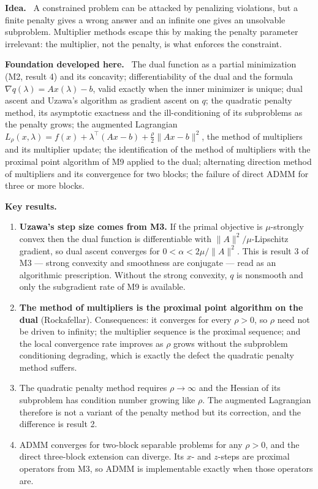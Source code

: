 \documentclass[11pt,a4paper]{article}
\newcommand{\mpart}[1]{\smallskip\noindent\textbf{#1}\ \ignorespaces}
\begin{document}
\mpart{Idea.} A constrained problem can be attacked by penalizing violations, but a finite
penalty gives a wrong answer and an infinite one gives an unsolvable subproblem. Multiplier
methods escape this by making the penalty parameter irrelevant: the multiplier, not the
penalty, is what enforces the constraint.

\mpart{Foundation developed here.} The dual function as a partial minimization (M2, result 4)
and its concavity; differentiability of the dual and the formula
$\nabla q(\lambda)=Ax(\lambda)-b$, valid exactly when the inner minimizer is unique; dual
ascent and Uzawa's algorithm as gradient ascent on $q$; the quadratic penalty method, its
asymptotic exactness and the ill-conditioning of its subproblems as the penalty grows; the
augmented Lagrangian $L_\rho(x,\lambda)=f(x)+\lambda^\top(Ax-b)+\tfrac\rho2\|Ax-b\|^2$, the
method of multipliers and its multiplier update; the identification of the method of
multipliers with the proximal point algorithm of M9 applied to the dual; alternating direction
method of multipliers and its convergence for two blocks; the failure of direct ADMM for three
or more blocks.

\mpart{Key results.}
\begin{enumerate}
\item \textbf{Uzawa's step size comes from M3.} If the primal objective is $\mu$-strongly
convex then the dual function is differentiable with $\|A\|^2/\mu$-Lipschitz gradient, so dual
ascent converges for $0<\alpha<2\mu/\|A\|^2$. This is result 3 of M3 --- strong convexity and
smoothness are conjugate --- read as an algorithmic prescription. Without the strong convexity,
$q$ is nonsmooth and only the subgradient rate of M9 is available.
\item \textbf{The method of multipliers is the proximal point algorithm on the dual}
(Rockafellar). Consequences: it converges for every $\rho>0$, so $\rho$ need not be driven to
infinity; the multiplier sequence is the proximal sequence; and the local convergence rate
improves as $\rho$ grows without the subproblem conditioning degrading, which is exactly the
defect the quadratic penalty method suffers.
\item The quadratic penalty method requires $\rho\to\infty$ and the Hessian of its subproblem
has condition number growing like $\rho$. The augmented Lagrangian therefore is not a variant
of the penalty method but its correction, and the difference is result 2.
\item ADMM converges for two-block separable problems for any $\rho>0$, and the direct
three-block extension can diverge. Its $x$- and $z$-steps are proximal operators from M3, so
ADMM is implementable exactly when those operators are.
\end{enumerate}
\end{document}
